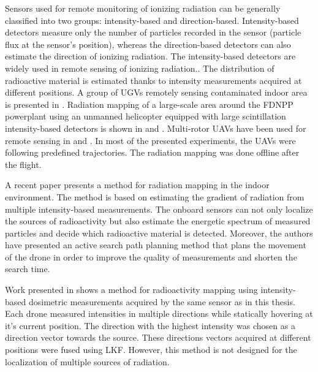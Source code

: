 Sensors used for remote monitoring of ionizing radiation can be generally classified into two groups: intensity-based and direction-based.
Intensity-based detectors measure only the number of particles recorded in the sensor (particle flux at the sensor's position), whereas the direction-based detectors can also estimate the direction of ionizing radiation.
The intensity-based detectors are widely used in remote sensing of ionizing radiation..
The distribution of radioactive material is estimated thanks to intensity measurements acquired at different positions.
A group of \ac{UGV}s remotely sensing contaminated indoor area is presented in \cite{fuku2012}.
Radiation mapping of a large-scale area around the \ac{FDNPP} powerplant using an unmanned helicopter equipped with large scintillation intensity-based detectors is shown in \cite{sanada2015} and \cite{towler2012}.
Multi-rotor \ac{UAV}s have been used for remote sensing in \cite{nine_drone_fukushima, ten_remote_sensing_with_uderstanding_uav_ugv} and \cite{eleven_remote_sensing_non_japan}.
In most of the presented experiments, the \ac{UAV}s were following predefined trajectories.
The radiation mapping was done offline after the flight.

A recent paper \cite{mascarich2022} presents a method for radiation mapping in the indoor environment.
The method is based on estimating the gradient of radiation from multiple intensity-based measurements.
The onboard sensors can not only localize the sources of radioactivity but also estimate the energetic spectrum of measured particles and decide which radioactive material is detected.
Moreover, the authors have presented an active search path planning method that plans the movement of the drone in order to improve the quality of measurements and shorten the search time.

Work presented in \cite{stibinger2020} shows a method for radioactivity mapping using intensity-based dosimetric measurements acquired by the same sensor as in this thesis.
Each drone measured intensities in multiple directions while statically hovering at it's current position.
The direction with the highest intensity was chosen as a direction vector towards the source.
These directions vectors acquired at different positions were fused using \ac{LKF}.
However, this method is not designed for the localization of multiple sources of radiation.

